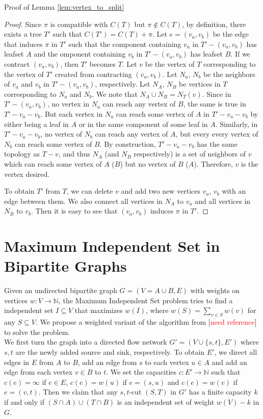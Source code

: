 \documentclass{bmcart}
\newcommand{\note}[1]{\textcolor{red}{#1}}
\begin{document}
Proof of Lemma \ref{lem:vertex_to_split}
\begin{proof}
Since $\pi$ is compatible with $C(T)$ but $\pi \notin C(T)$, by definition, there exists a tree $T'$ such that $C(T') = C(T) + \pi$. Let $e = (v_a,v_b)$ be the edge that induces $\pi$ in $T'$ such that the component containing $v_a$ in $T'-(v_a,v_b)$ has leafset $A$ and the omponent containing $v_b$ in $T'-(v_a,v_b)$ has leafset $B$. If we contract $(v_a,v_b)$, then $T'$ becomes $T$. Let $v$ be the vertex of $T$ corresponding to the vertex of $T'$ created from contracting $(v_a,v_b)$. Let $N_a$, $N_b$ be the neighbors of $v_a$ and $v_b$ in $T'-(v_a,v_b)$, respectively. Let $N_A$, $N_B$ be vertices in $T$ corresponding to $N_a$ and $N_b$. We note that $N_A \cup N_B = N_T(v)$. Since in $T' -(v_a,v_b)$, no vertex in $N_a$ can reach any vertex of $B$, the same is true in $T' - v_a - v_b$. But each vertex in $N_a$ can reach some vertex of $A$ in $T' - v_a - v_b$ by either being a leaf in $A$ or in the same component of some leaf in $A$. Similarly, in $T' - v_a - v_b$, no vertex of $N_b$ can reach any vertex of $A$, but every every vertex of $N_b$ can reach some vertex of $B$. By construction, $T' - v_a - v_b$ has the same topology as $T - v$, and thus $N_A$ (and $N_B$ respectively) is a set of neighbors of $v$ which can reach some vertex of $A$ ($B$) but no vertex of $B$ ($A$). Therefore, $v$ is the vertex desired. 

To obtain $T'$ from $T$, we can delete $v$ and add two new vertices $v_a$, $v_b$ with an edge between them. We also connect all vertices in $N_A$ to $v_a$ and all vertices in $N_B$ to $v_b$. Then it is easy to see that $(v_a,v_b)$ induces $\pi$ in $T'$. 
\end{proof}

\section{Maximum Independent Set in Bipartite Graphs}
Given an undirected bipartite graph $G= (V = A \cup B, E)$ with weights on vertices $w: V \to \mathbb{N}$, the Maximum Independent Set problem tries to find a independent set $I \subseteq V$ that maximizes $w(I)$, where $w(S) = \sum_{v\in S}w(v)$ for any $S \subseteq V$. We propose a weighted variant of the algorithm from [\note{need reference}] to solve the problem. \\

We first turn the graph into a directed flow network $G' = (V \cup \{s,t\}, E')$ where $s, t$ are the newly added source and sink, respectively. To obtain $E'$, we direct all edges in $E$ from $A$ to $B$, add an edge from $s$ to each vertex $u \in A$ and add an edge from each vertex $v \in B$ to $t$. We set the capacities $c: E' \to \mathbb{N}$ such that $c(e) = \infty$ if $e \in E$, $c(e) = w(u)$ if $e = (s,u)$ and $c(e) = w(v)$ if $e = (v,t)$. Then we claim that any $s,t$-cut $(S,T)$ in $G'$ has a finite capacity $k$ if and only if $(S\cap A) \cup (T \cap B)$ is an independent set of weight $w(V) - k$ in $G$. \\
\end{document}
